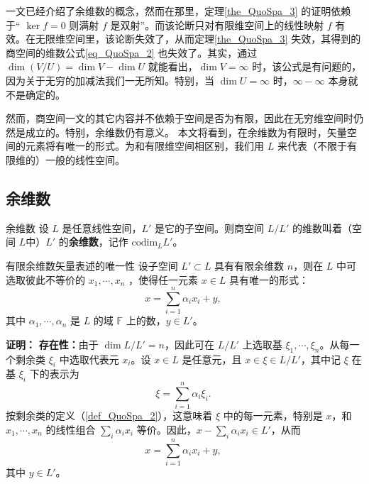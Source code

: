 

一文已经介绍了余维数的概念，然而在那里，定理\autoref{the_QuoSpa_3} 的证明依赖于“ $\ker f=0$ 则满射 $f$ 是双射”。而该论断只对有限维空间上的线性映射 $f$ 有效。在无限维空间里，该论断失效了，从而定理\autoref{the_QuoSpa_3} 失效，其得到的商空间的维数公式\autoref{eq_QuoSpa_2} 也失效了。其实，通过 $\dim(V/U) = \dim V - \dim U$ 就能看出，$\dim V=\infty$ 时，该公式是有问题的，因为关于无穷的加减法我们一无所知。特别，当 $\dim U=\infty$ 时，$\infty-\infty$ 本身就不是确定的。

然而，商空间一文的其它内容并不依赖于空间是否为有限，因此在无穷维空间时仍然是成立的。特别，余维数仍有意义。 本文将看到，在余维数为有限时，矢量空间的元素将有唯一的形式。为和有限维空间相区别，我们用 $L$ 来代表（不限于有限维的）一般的线性空间。

\subsection{余维数}

\begin{definition}{余维数}
设 $L$ 是任意线性空间，$L'$ 是它的子空间。则商空间 $L/L'$ 的维数叫着（空间 $L$中）$L'$ 的\textbf{余维数}，记作 $\mathrm{codim}_L L'$。 
\end{definition}


\begin{theorem}{有限余维数矢量表述的唯一性}
设子空间 $L'\subset L$ 具有有限余维数 $n$，则在 $L$ 中可选取彼此不等价的 $x_1,\cdots,x_n$ ，使得任一元素 $x\in L$ 具有唯一的形式：
\begin{equation}
x=\sum_{i=1}^n\alpha_i x_i+y,~
\end{equation}
其中 $\alpha_1,\cdots,\alpha_n$ 是 $L$ 的域 $\mathbb F$ 上的数，$y\in L'$。
\end{theorem}

\textbf{证明：}
\textbf{存在性：}由于 $\dim L/L'=n$，因此可在 $L/L'$ 上选取基 $\xi_1,\cdots,\xi_n$。从每一个剩余类 $\xi_i$ 中选取代表元 $x_i$。设 $x\in L$ 是任意元，且 $x\in\xi\in L/L'$，其中记 $\xi$ 在基 $\xi_i$ 下的表示为
\begin{equation}
\xi=\sum_{i=1}^n\alpha_i\xi_i.~
\end{equation}
按剩余类的定义（\autoref{def_QuoSpa_2}），这意味着 $\xi$ 中的每一元素，特别是 $x$，和 $x_1,\cdots,x_n$ 的线性组合 $\sum_i\alpha_i x_i$ 等价。因此，$x-\sum_i\alpha_i x_i\in L'$，从而
\begin{equation}
x=\sum_{i=1}^n\alpha_i x_i+y,~
\end{equation}
其中 $y\in L'$。

